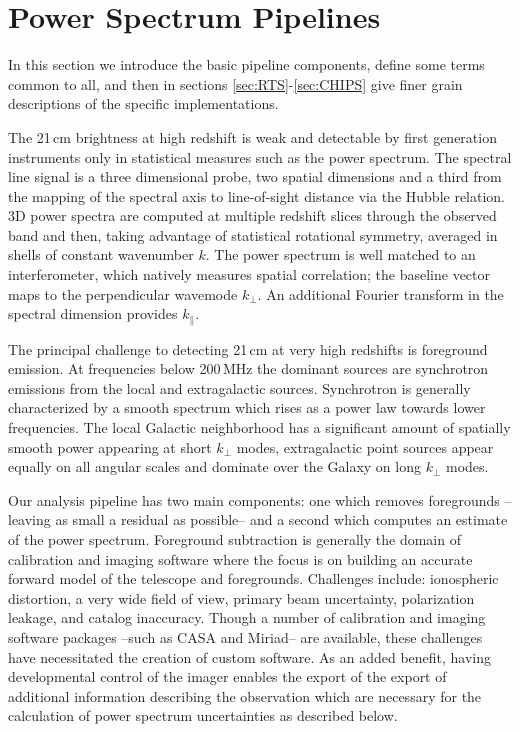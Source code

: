 \documentclass[twolcolumn]{emulateapj}
\begin{document}
\section{Power Spectrum Pipelines}
\label{sec:pipelines}
In this section we introduce the basic pipeline components, define some terms common to all, and then in sections \ref{sec:RTS}-\ref{sec:CHIPS} give finer grain descriptions of the specific implementations.

The 21\,cm brightness at high redshift is weak and detectable by first generation instruments only in	 statistical measures such as the power spectrum. The spectral line signal is a three dimensional probe, two spatial dimensions and a third from the mapping of the spectral axis to line-of-sight distance via the Hubble relation. 3D power spectra are computed at multiple redshift slices through the observed band and then, taking advantage of statistical rotational symmetry, averaged in shells of constant wavenumber $k$.  The power spectrum is well matched to an interferometer, which natively measures spatial correlation; the baseline vector maps to the perpendicular wavemode $k_\perp$.  An additional Fourier transform in the spectral dimension provides $k_\parallel$.  

The principal challenge to detecting 21\,cm at very high redshifts is foreground emission. At frequencies below 200\,MHz the dominant sources are synchrotron emissions from the local and extragalactic sources. Synchrotron is generally characterized by a smooth spectrum which rises as a power law towards lower frequencies. The local Galactic neighborhood has a significant amount of spatially smooth power appearing at short $k_\perp$ modes, extragalactic point sources appear equally on all angular scales and dominate over the Galaxy on long $k_\perp$ modes.

Our analysis pipeline has two main components: one which removes foregrounds --leaving as small a residual as possible-- and a second which computes an estimate of the power spectrum.   Foreground subtraction is generally the domain of calibration and imaging software where the focus is on building an accurate forward model of the telescope and foregrounds.  Challenges include: ionospheric distortion, a very wide field of view, primary beam uncertainty, polarization leakage, and catalog inaccuracy. Though a number of calibration and imaging software packages --such as CASA and Miriad-- are available, these challenges have necessitated the creation of custom software.  As an added benefit, having developmental control of the imager enables the export of the export of additional information describing the observation which are necessary for the calculation of power spectrum uncertainties as described below. 
\end{document}
